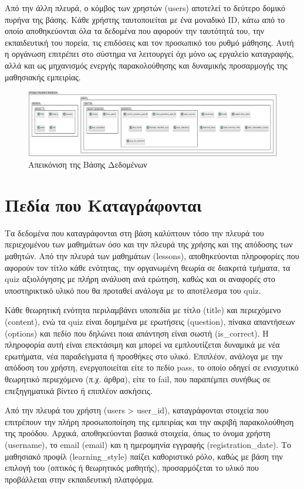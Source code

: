 \documentclass[11pt]{report}
\begin{document}
Από την άλλη πλευρά, ο κόμβος των χρηστών (users) αποτελεί το δεύτερο δομικό πυρήνα της βάσης. Κάθε χρήστης ταυτοποιείται με ένα μοναδικό ID, κάτω από το οποίο αποθηκεύονται όλα τα δεδομένα που αφορούν την ταυτότητά του, την εκπαιδευτική του πορεία, τις επιδόσεις και τον προσωπικό του ρυθμό μάθησης. Αυτή η οργάνωση επιτρέπει στο σύστημα να λειτουργεί όχι μόνο ως εργαλείο καταγραφής, αλλά και ως μηχανισμός ενεργής παρακολούθησης και δυναμικής προσαρμογής της μαθησιακής εμπειρίας.

\begin{figure}[H]
    \centering
    \includegraphics[width=0.9\linewidth]{Figures/image012.png}
    \caption{Απεικόνιση της Βάσης Δεδομένων}
    \label{fig:architecture-flow}
\end{figure}
\section{Πεδία που Καταγράφονται}

Τα δεδομένα που καταγράφονται στη βάση καλύπτουν τόσο την πλευρά του περιεχομένου των μαθημάτων όσο και την πλευρά της χρήσης και της απόδοσης των μαθητών. Από την πλευρά των μαθημάτων (lessons), αποθηκεύονται πληροφορίες που αφορούν τον τίτλο κάθε ενότητας, την οργανωμένη θεωρία σε διακριτά τμήματα, τα quiz αξιολόγησης με πλήρη ανάλυση ανά ερώτηση, καθώς και οι αναφορές στο υποστηρικτικό υλικό που θα προταθεί ανάλογα με το αποτέλεσμα του quiz.

Κάθε θεωρητική ενότητα περιλαμβάνει υποπεδία με τίτλο (title) και περιεχόμενο (content), ενώ τα quiz είναι δομημένα με ερωτήσεις (question), πίνακα απαντήσεων (options) και πεδίο που δηλώνει ποια απάντηση είναι σωστή (is\_correct). Η πληροφορία αυτή είναι επεκτάσιμη και μπορεί να εμπλουτίζεται δυναμικά με νέα ερωτήματα, νέα παραδείγματα ή προσθήκες στο υλικό. Επιπλέον, ανάλογα με την απόδοση του χρήστη, ενεργοποιείται είτε το πεδίο pass, το οποίο οδηγεί σε ενισχυτικό θεωρητικό περιεχόμενο (π.χ. άρθρα), είτε το fail, που παραπέμπει συνήθως σε επεξηγηματικά βίντεο ή επιπλέον ασκήσεις.

Από την πλευρά του χρήστη (users > user\_id), καταγράφονται στοιχεία που επιτρέπουν την πλήρη προσωποποίηση της εμπειρίας και την ακριβή παρακολούθηση της προόδου. Αρχικά, αποθηκεύονται βασικά στοιχεία, όπως το όνομα χρήστη (username), το email (email) και η ημερομηνία εγγραφής (registration\_date). Το μαθησιακό προφίλ (learning\_style) παίζει καθοριστικό ρόλο, καθώς με βάση την επιλογή του (οπτικός ή θεωρητικός μαθητής), προσαρμόζεται το υλικό που προβάλλεται στην εκπαιδευτική πλατφόρμα.
\end{document}
